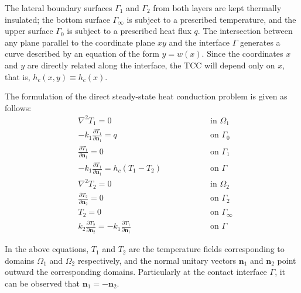 \documentclass[conference,compsoc,fleqn]{IEEEtran}
\begin{document}
The lateral boundary surfaces $\Gamma_1$ and $\Gamma_2$ from both layers are kept thermally insulated; the bottom surface $\Gamma_\infty$ is subject to a prescribed temperature, and the upper surface $\Gamma_0$ is subject to a prescribed heat flux $q$. The intersection between any plane parallel to the coordinate plane $xy$ and the interface $\Gamma$ generates a curve described by an equation of the form $y = w(x)$. Since the coordinates $x$ and $y$ are directly related along the interface, the TCC will depend only on $x$, that is, $h_c(x, y) \equiv h_c(x)$.

The formulation of the direct steady-state heat conduction problem is given as follows:
\begin{subequations}
	\begin{alignat}{2}
		& \nabla^2 T_1 = 0 \quad\quad\quad\quad && \text{ in } \Omega_1 \label{harm_T1} \\ 
		& -k_1 \frac{\partial T_1}{\partial\mathbf{n}_1} = q && \text{ on } \Gamma_0  \label{cc_T1_2} \\ 
		& \frac{\partial T_1}{\partial \mathbf{n}_1} = 0 && \text{ on }  \Gamma_1 \label{cc_T1_1} \\ 
		& -k_1 \frac{\partial T_1}{\partial\mathbf{n}_1} = h_c(T_1-T_2) \quad\quad\quad\quad && \text{ on }  \Gamma \label{cc_grad_T1} \\ 
		& \nabla^2 T_2 = 0 && \text{ in }  \Omega_2 \label{harm_T2} \\ 
		& \frac{\partial T_2}{\partial \mathbf{n}_2} = 0 && \text{ on }  \Gamma_2 \label{cc_T1_3} \\
		& T_2 = 0 && \text{ on }  \Gamma_\infty \label{cc_T1_4} \\ 
		& k_2\frac{\partial T_2}{\partial\mathbf{n}_2} = - k_1\frac{\partial T_1}{\partial\mathbf{n}_1} && \text{ on }  \Gamma \label{cc_T1_5}
	\end{alignat}
\end{subequations}

In the above equations, $T_1$ and $T_2$ are the temperature fields corresponding to domains $\Omega_1$ and $\Omega_2$ respectively, and the normal unitary vectors $\mathbf{n}_1$ and $\mathbf{n}_2$ point outward the corresponding domains. Particularly at the contact interface $\Gamma$, it can be observed that $\mathbf{n}_1 = -\mathbf{n}_2$.
\\

\end{document}
